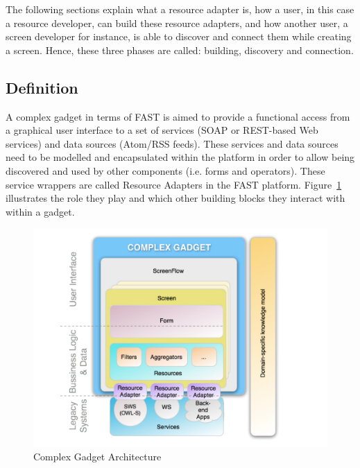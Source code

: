\documentclass{fast_latex}
\begin{document}
The following sections explain what a resource adapter is, how a user, in this case a resource developer, can build these resource adapters, and how another user, a screen developer for instance, is able to discover and connect them while creating a screen. Hence, these three phases are called: building, discovery and connection.

\subsection{Definition} %
\label{sub:definition}

A complex gadget in terms of FAST is aimed to provide a functional access from a graphical user interface to a set of services (SOAP or REST-based Web services) and data sources (Atom/RSS feeds). These services and data sources need to be modelled and encapsulated within the platform in order to allow being discovered and used by other components (i.e. forms and operators). These service wrappers are called Resource Adapters in the FAST platform. Figure~\ref{fig:complex_gadget_architecture} illustrates the role they play and which other building blocks they interact with within a gadget.

\begin{figure}[!htb]
  \begin{center}
    \includegraphics[width=\linewidth]{images/ComplexGadgetArchitecture.pdf}
    \caption{Complex Gadget Architecture}
    \label{fig:complex_gadget_architecture}
  \end{center}
\end{figure}
\end{document}
